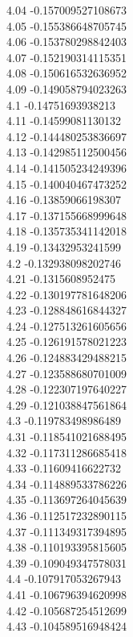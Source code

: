 {4.04	-0.157009527108673\\
4.05	-0.155386648705745\\
4.06	-0.153780298842403\\
4.07	-0.152190314115351\\
4.08	-0.150616532636952\\
4.09	-0.149058794023263\\
4.1	-0.14751693938213\\
4.11	-0.14599081130132\\
4.12	-0.144480253836697\\
4.13	-0.142985112500456\\
4.14	-0.141505234249396\\
4.15	-0.140040467473252\\
4.16	-0.13859066198307\\
4.17	-0.137155668999648\\
4.18	-0.135735341142018\\
4.19	-0.13432953241599\\
4.2	-0.132938098202746\\
4.21	-0.1315608952475\\
4.22	-0.130197781648206\\
4.23	-0.128848616844327\\
4.24	-0.127513261605656\\
4.25	-0.126191578021223\\
4.26	-0.124883429488215\\
4.27	-0.123588680701009\\
4.28	-0.122307197640227\\
4.29	-0.121038847561864\\
4.3	-0.119783498986489\\
4.31	-0.118541021688495\\
4.32	-0.117311286685418\\
4.33	-0.11609416622732\\
4.34	-0.114889533786226\\
4.35	-0.113697264045639\\
4.36	-0.112517232890115\\
4.37	-0.111349317394895\\
4.38	-0.110193395815605\\
4.39	-0.109049347578031\\
4.4	-0.107917053267943\\
4.41	-0.106796394620998\\
4.42	-0.105687254512699\\
4.43	-0.104589516948424\\
}
